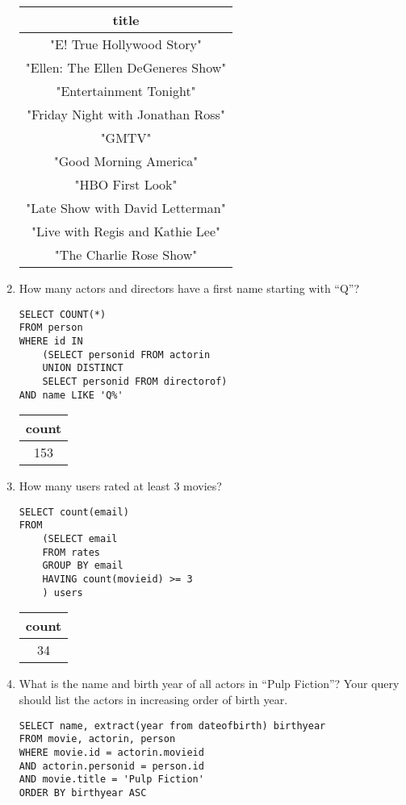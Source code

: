 \begin{enumerate}
\begin{tabular}{|c|}
\hline
title \\ \hline
"E! True Hollywood Story" \\ \hline
"Ellen: The Ellen DeGeneres Show" \\ \hline
"Entertainment Tonight" \\ \hline
"Friday Night with Jonathan Ross" \\ \hline
"GMTV" \\ \hline
"Good Morning America" \\ \hline
"HBO First Look" \\ \hline
"Late Show with David Letterman" \\ \hline
"Live with Regis and Kathie Lee" \\ \hline
"The Charlie Rose Show" \\ \hline
\end{tabular}

\item How many actors and directors have a first name starting with “Q”?

\begin{lstlisting}
SELECT COUNT(*)
FROM person
WHERE id IN
	(SELECT personid FROM actorin
	UNION DISTINCT
	SELECT personid FROM directorof)
AND name LIKE 'Q%'
\end{lstlisting}

\begin{tabular}{|c|}
\hline
count \\ \hline
153 \\ \hline
\end{tabular}

\item How many users rated at least 3 movies?

\begin{lstlisting}
SELECT count(email)
FROM 
	(SELECT email
	FROM rates
	GROUP BY email
	HAVING count(movieid) >= 3
	) users
\end{lstlisting}

\begin{tabular}{|c|}
\hline
count \\ \hline
34 \\ \hline
\end{tabular}

\item What is the name and birth year of all actors in “Pulp Fiction”? Your query should list the actors in increasing order of birth year.

\begin{lstlisting}
SELECT name, extract(year from dateofbirth) birthyear
FROM movie, actorin, person
WHERE movie.id = actorin.movieid
AND actorin.personid = person.id
AND movie.title = 'Pulp Fiction'
ORDER BY birthyear ASC
\end{lstlisting}


\end{enumerate}

